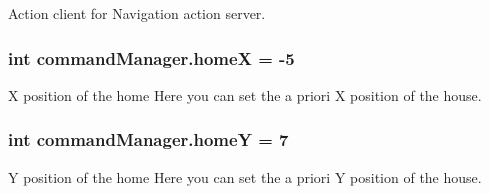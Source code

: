 Action client for Navigation action server. 

\subsubsection[{\texorpdfstring{homeX}{homeX}}]{\setlength{\rightskip}{0pt plus 5cm}int command\+Manager.\+homeX = -\/5}\hypertarget{namespacecommandManager_afd4e45cbe13ed5ee1c795062ed21e184}{}\label{namespacecommandManager_afd4e45cbe13ed5ee1c795062ed21e184}


X position of the home Here you can set the a priori X position of the house. 

\subsubsection[{\texorpdfstring{homeY}{homeY}}]{\setlength{\rightskip}{0pt plus 5cm}int command\+Manager.\+homeY = 7}\hypertarget{namespacecommandManager_a9deb4aa18f5f193991dbfb07d1f8e0b3}{}\label{namespacecommandManager_a9deb4aa18f5f193991dbfb07d1f8e0b3}


Y position of the home Here you can set the a priori Y position of the house. 

